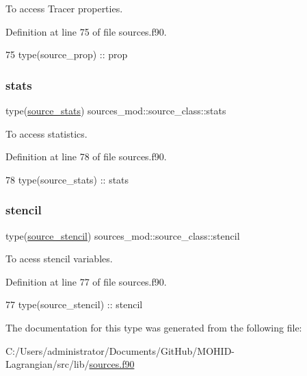 To access Tracer properties. 



Definition at line 75 of file sources.\+f90.


\begin{DoxyCode}
75         \textcolor{keywordtype}{type}(source\_prop)  :: prop
\end{DoxyCode}
\mbox{\label{structsources__mod_1_1source__class_a2ed110f187434e6b6345f21822993517}} 
\subsubsection{\texorpdfstring{stats}{stats}}
{\footnotesize\ttfamily type(\mbox{\hyperlink{structsources__mod_1_1source__stats}{source\+\_\+stats}}) sources\+\_\+mod\+::source\+\_\+class\+::stats\hspace{0.3cm}{\ttfamily [private]}}



To access statistics. 



Definition at line 78 of file sources.\+f90.


\begin{DoxyCode}
78         \textcolor{keywordtype}{type}(source\_stats) :: stats
\end{DoxyCode}
\mbox{\label{structsources__mod_1_1source__class_a7950d4033c4b4be466479fc8a11dad1c}} 
\subsubsection{\texorpdfstring{stencil}{stencil}}
{\footnotesize\ttfamily type(\mbox{\hyperlink{structsources__mod_1_1source__stencil}{source\+\_\+stencil}}) sources\+\_\+mod\+::source\+\_\+class\+::stencil\hspace{0.3cm}{\ttfamily [private]}}



To acess stencil variables. 



Definition at line 77 of file sources.\+f90.


\begin{DoxyCode}
77         \textcolor{keywordtype}{type}(source\_stencil) :: stencil
\end{DoxyCode}


The documentation for this type was generated from the following file\+:\begin{DoxyCompactItemize}
\item 
C\+:/\+Users/administrator/\+Documents/\+Git\+Hub/\+M\+O\+H\+I\+D-\/\+Lagrangian/src/lib/\mbox{\hyperlink{sources_8f90}{sources.\+f90}}\end{DoxyCompactItemize}
